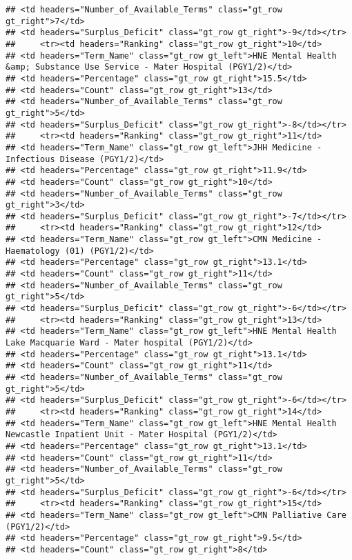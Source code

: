 \documentclass[
]{article}
\begin{document}
\begin{verbatim}
## <td headers="Number_of_Available_Terms" class="gt_row gt_right">7</td>
## <td headers="Surplus_Deficit" class="gt_row gt_right">-9</td></tr>
##     <tr><td headers="Ranking" class="gt_row gt_right">10</td>
## <td headers="Term_Name" class="gt_row gt_left">HNE Mental Health &amp; Substance Use Service - Mater Hospital (PGY1/2)</td>
## <td headers="Percentage" class="gt_row gt_right">15.5</td>
## <td headers="Count" class="gt_row gt_right">13</td>
## <td headers="Number_of_Available_Terms" class="gt_row gt_right">5</td>
## <td headers="Surplus_Deficit" class="gt_row gt_right">-8</td></tr>
##     <tr><td headers="Ranking" class="gt_row gt_right">11</td>
## <td headers="Term_Name" class="gt_row gt_left">JHH Medicine - Infectious Disease (PGY1/2)</td>
## <td headers="Percentage" class="gt_row gt_right">11.9</td>
## <td headers="Count" class="gt_row gt_right">10</td>
## <td headers="Number_of_Available_Terms" class="gt_row gt_right">3</td>
## <td headers="Surplus_Deficit" class="gt_row gt_right">-7</td></tr>
##     <tr><td headers="Ranking" class="gt_row gt_right">12</td>
## <td headers="Term_Name" class="gt_row gt_left">CMN Medicine - Haematology (01) (PGY1/2)</td>
## <td headers="Percentage" class="gt_row gt_right">13.1</td>
## <td headers="Count" class="gt_row gt_right">11</td>
## <td headers="Number_of_Available_Terms" class="gt_row gt_right">5</td>
## <td headers="Surplus_Deficit" class="gt_row gt_right">-6</td></tr>
##     <tr><td headers="Ranking" class="gt_row gt_right">13</td>
## <td headers="Term_Name" class="gt_row gt_left">HNE Mental Health Lake Macquarie Ward - Mater hospital (PGY1/2)</td>
## <td headers="Percentage" class="gt_row gt_right">13.1</td>
## <td headers="Count" class="gt_row gt_right">11</td>
## <td headers="Number_of_Available_Terms" class="gt_row gt_right">5</td>
## <td headers="Surplus_Deficit" class="gt_row gt_right">-6</td></tr>
##     <tr><td headers="Ranking" class="gt_row gt_right">14</td>
## <td headers="Term_Name" class="gt_row gt_left">HNE Mental Health Newcastle Inpatient Unit - Mater Hospital (PGY1/2)</td>
## <td headers="Percentage" class="gt_row gt_right">13.1</td>
## <td headers="Count" class="gt_row gt_right">11</td>
## <td headers="Number_of_Available_Terms" class="gt_row gt_right">5</td>
## <td headers="Surplus_Deficit" class="gt_row gt_right">-6</td></tr>
##     <tr><td headers="Ranking" class="gt_row gt_right">15</td>
## <td headers="Term_Name" class="gt_row gt_left">CMN Palliative Care (PGY1/2)</td>
## <td headers="Percentage" class="gt_row gt_right">9.5</td>
## <td headers="Count" class="gt_row gt_right">8</td>

\end{verbatim}
\end{document}
